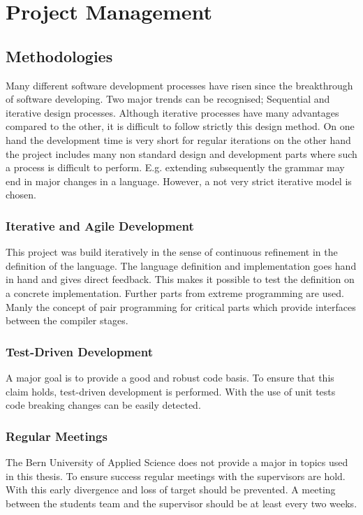 \part{Project Management}
\chapter{Methodologies}
Many different software development processes have risen since the
breakthrough of software developing. Two major trends can be recognised;
Sequential and iterative design processes. Although iterative processes
have many advantages compared to the other, it is difficult to follow
strictly this design method. On one hand the development time is very
short for regular iterations on the other hand the project includes
many non standard design and development parts where such a process is
difficult to perform. E.g. extending subsequently the grammar may end
in major changes in a language. However, a not very strict iterative
model is chosen.

\section{Iterative and Agile Development}
This project was build iteratively in the sense of continuous
refinement in the definition of the language. The language definition and
implementation goes hand in hand and gives direct feedback. This makes it
possible to test the definition on a concrete implementation. Further
parts from extreme programming are used. Manly the concept of pair
programming for critical parts which provide interfaces between the
compiler stages.

\section{Test-Driven Development}
A major goal is to provide a good and robust code basis. To ensure that
this claim holds, test-driven development is performed. With the use of
unit tests code breaking changes can be easily detected.

\section{Regular Meetings}
The Bern University of Applied Science does not provide a major in
topics used in this thesis. To ensure success regular meetings with the
supervisors are hold. With this early divergence and loss of target should
be prevented. A meeting between the students team and the supervisor
should be at least every two weeks.

